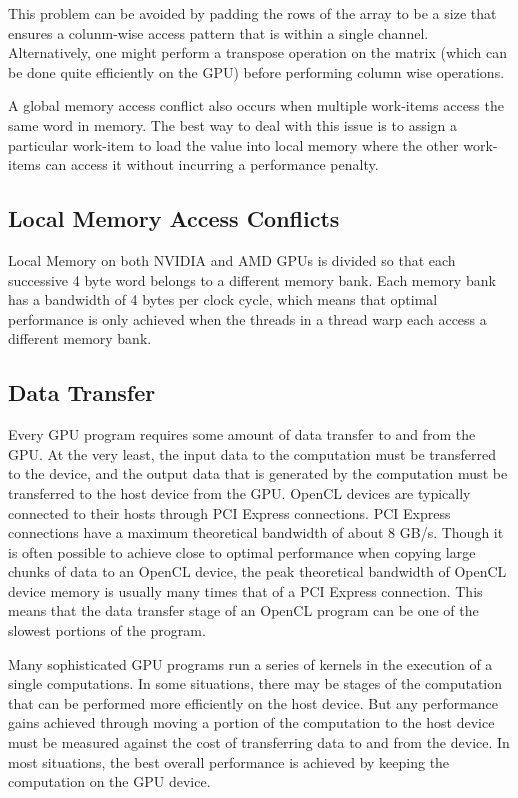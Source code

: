 \documentclass[12pt,twoside]{reedthesis}
\begin{document}
This problem can be avoided by padding the rows of the array to be a size that ensures a colunm-wise access pattern that is within a single channel. Alternatively, one might perform a transpose operation on the matrix (which can be done quite efficiently on the GPU) before performing column wise operations.

A global memory access conflict also occurs when multiple work-items access the same word in memory. The best way to deal with this issue is to assign a particular work-item to load the value into local memory where the other work-items can access it without incurring a performance penalty.

\subsection{Local Memory Access Conflicts}

Local Memory on both NVIDIA and AMD GPUs is divided so that each successive 4 byte word belongs to a different memory bank. Each memory bank has a bandwidth of 4 bytes per clock cycle, which means that optimal performance is only achieved when the threads in a thread warp each access a different memory bank.

\subsection{Data Transfer}

Every GPU program requires some amount of data transfer to and from the GPU. At the very least, the input data to the computation must be transferred to the device, and the output data that is generated by the computation must be transferred to the host device from the GPU. OpenCL devices are typically connected to their hosts through PCI Express connections. PCI Express connections have a maximum theoretical bandwidth of about 8 GB/s. Though it is often possible to achieve close to optimal performance when copying large chunks of data to an OpenCL device, the peak theoretical bandwidth of OpenCL device memory is usually many times that of a PCI Express connection. This means that the data transfer stage of an OpenCL program can be one of the slowest portions of the program.

Many sophisticated GPU programs run a series of kernels in the execution of a single computations. In some situations, there may be stages of the computation that can be performed more efficiently on the host device. But any performance gains achieved through moving a portion of the computation to the host device must be measured against the cost of transferring data to and from the device. In most situations, the best overall performance is achieved by keeping the computation on the GPU device. 
\end{document}
